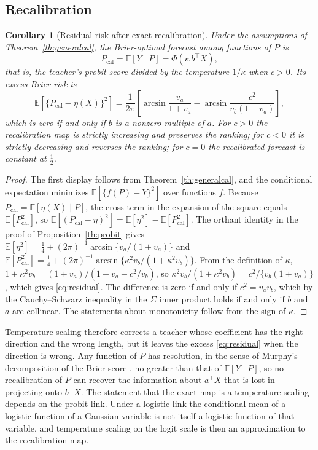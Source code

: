 \documentclass[11pt]{article}
\newtheorem{corollary}[theorem]{Corollary}
\theoremstyle{remark}
\newcommand{\E}{\mathbb E}
\newcommand{\1}{\mathbf 1}
\begin{document}
\subsection{Recalibration}
\begin{corollary}[Residual risk after exact recalibration]\label{cor:recal}
Under the assumptions of Theorem~\ref{th:generalcal}, the Brier-optimal forecast among functions of $P$ is
\begin{equation}
P_{\mathrm{cal}}=\E[Y\mid P]=\Phi(\kappa\, b^\top X),
\end{equation}
that is, the teacher's probit score divided by the temperature $1/\kappa$ when $c>0$. Its excess Brier risk is
\begin{equation}\label{eq:residual}
\E[\{P_{\mathrm{cal}}-\eta(X)\}^2]=\frac{1}{2\pi}\left[\arcsin\frac{v_a}{1+v_a}-\arcsin\frac{c^2}{v_b(1+v_a)}\right],
\end{equation}
which is zero if and only if $b$ is a nonzero multiple of $a$. For $c>0$ the recalibration map is strictly increasing and preserves the ranking; for $c<0$ it is strictly decreasing and reverses the ranking; for $c=0$ the recalibrated forecast is constant at $\tfrac12$.
\end{corollary}
\begin{proof}
The first display follows from Theorem~\ref{th:generalcal}, and the conditional expectation minimizes $\E[\{f(P)-Y\}^2]$ over functions $f$. Because $P_{\mathrm{cal}}=\E[\eta(X)\mid P]$, the cross term in the expansion of the square equals $\E[P_{\mathrm{cal}}^2]$, so $\E[(P_{\mathrm{cal}}-\eta)^2]=\E[\eta^2]-\E[P_{\mathrm{cal}}^2]$. The orthant identity in the proof of Proposition~\ref{th:probit} gives $\E[\eta^2]=\tfrac14+(2\pi)^{-1}\arcsin\{v_a/(1+v_a)\}$ and $\E[P_{\mathrm{cal}}^2]=\tfrac14+(2\pi)^{-1}\arcsin\{\kappa^2v_b/(1+\kappa^2v_b)\}$. From the definition of $\kappa$, $1+\kappa^2v_b=(1+v_a)/(1+v_a-c^2/v_b)$, so $\kappa^2v_b/(1+\kappa^2v_b)=c^2/\{v_b(1+v_a)\}$, which gives \eqref{eq:residual}. The difference is zero if and only if $c^2=v_av_b$, which by the Cauchy--Schwarz inequality in the $\Sigma$ inner product holds if and only if $b$ and $a$ are collinear. The statements about monotonicity follow from the sign of $\kappa$.
\end{proof}

Temperature scaling therefore corrects a teacher whose coefficient has the right direction and the wrong length, but it leaves the excess \eqref{eq:residual} when the direction is wrong. Any function of $P$ has resolution, in the sense of Murphy's decomposition of the Brier score \cite{murphy}, no greater than that of $\E[Y\mid P]$, so no recalibration of $P$ can recover the information about $a^\top X$ that is lost in projecting onto $b^\top X$. The statement that the exact map is a temperature scaling depends on the probit link. Under a logistic link the conditional mean of a logistic function of a Gaussian variable is not itself a logistic function of that variable, and temperature scaling on the logit scale \cite{guo} is then an approximation to the recalibration map.
\end{document}
